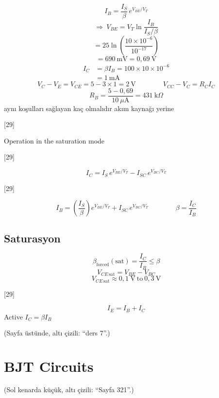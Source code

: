 \documentclass[11pt,a4paper]{article}
\begin{document}
\begin{cozum}
\[ I_B = \frac{I_S}{\beta}\,e^{V_{BE}/V_T} \]
\[ \Rightarrow\ V_{BE} = V_T \ln\frac{I_B}{I_S/\beta} \]
\[ = 25\ln\left(\frac{10\times 10^{-6}}{10^{-17}}\right) \]
\[ = 690\ \mathrm{mV} = 0{,}69\ \mathrm{V} \]
\begin{align*}
I_C &= \beta I_B = 100\times 10\times 10^{-6} \\
 &= 1\ \mathrm{mA}
\end{align*}
\[ V_C - V_E = V_{CE} = 5-3\times 1 = 2\ \mathrm{V} \qquad\qquad V_{CC}-V_C = R_C I_C \]
\[ R_B = \frac{5-0{,}69}{10\ \mu\mathrm{A}} = 431\ \mathrm{k}\Omega \]
aynı koşulları sağlayan  kaç olmalıdır akım kaynağı yerine
\end{cozum}

[29]

Operation in the saturation mode

[29]

\[ I_C = I_S\,e^{V_{BE}/V_T} - I_{SC}\,e^{V_{BC}/V_T} \]


[29]

\[ I_B = \left(\frac{I_S}{\beta}\right)e^{V_{BE}/V_T} + I_{SC}\,e^{V_{BC}/V_T} \qquad\qquad \beta = \frac{I_C}{I_B} \]

\subsection*{Saturasyon}
\[ \beta_{\text{forced}}(\text{sat}) = \frac{I_C}{I_B} \le \beta \]
\[ V_{CE\,\mathrm{sat}} = V_{BE}-V_{BC} \]
\[ V_{CE\,\mathrm{sat}} \approx 0{,}1\ \mathrm{V}\ \text{to}\ 0{,}3\ \mathrm{V} \]

[29]

\[ I_E = I_B+I_C \]
Active \quad $I_C = \beta I_B$

{\small\color{kursunkalem}(Sayfa üstünde, altı çizili: ``ders 7''.)}
\section{BJT Circuits}
{\small\color{kursunkalem}(Sol kenarda küçük, altı çizili: ``Sayfa 321''.)}
\end{document}

